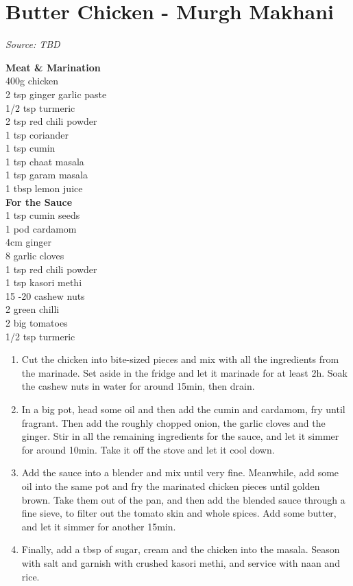 \documentclass{report}
\begin{document}
\section[Butter Chicken]{Butter Chicken - Murgh Makhani}
\textit{Source: TBD}\\
\begin{minipage}[t]{0.21\textwidth} \vspace{0pt} 
\textbf{Meat \& Marination}\\
400g chicken \\
2 tsp ginger garlic paste \\
1/2 tsp turmeric\\
2 tsp red chili powder\\
1 tsp coriander  \\
1 tsp cumin  \\
1 tsp chaat masala  \\
1 tsp garam masala \\
1 tbsp lemon juice \\

\textbf{For the Sauce}\\
1 tsp cumin seeds \\
1 pod cardamom\\
4cm ginger \\
8 garlic cloves\\
1 tsp red chili powder\\
1 tsp kasori methi\\
15 -20 cashew nuts\\
2 green chilli\\
2 big tomatoes\\
1/2 tsp turmeric
\end{minipage}
\hfill
\begin{minipage}[t]{0.79\textwidth}
	\begin{enumerate}
		\item Cut the chicken into bite-sized pieces and mix with all the ingredients from the marinade. Set aside in the fridge and let it marinade for at least 2h. Soak the cashew nuts in water for around 15min, then drain.
		\item In a big pot, head some oil and then add the cumin and cardamom, fry until fragrant. Then add the roughly chopped onion, the garlic cloves and the ginger. Stir in all the remaining ingredients for the sauce, and let it simmer for around 10min. Take it off the stove and let it cool down.
		\item Add the sauce into a blender and mix until very fine. Meanwhile, add some oil into the same pot and fry the marinated chicken pieces until golden brown. Take them out of the pan, and then add the blended sauce through a fine sieve, to filter out the tomato skin and whole spices. Add some butter, and let it simmer for another 15min.
		\item Finally, add a tbsp of sugar, cream and the chicken into the masala. Season with salt and garnish with crushed kasori methi, and service with naan and rice.
	\end{enumerate}	
\end{minipage}
\end{document}
